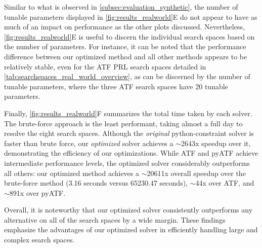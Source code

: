 Similar to what is observed in \cref{subsec:evaluation_synthetic}, the number of tunable parameters displayed in \cref{fig:results_realworld}E do not appear to have as much of an impact on performance as the other plots discussed. 
Nevertheless, \cref{fig:results_realworld}E is useful to discern the individual search spaces based on the number of parameters. 
For instance, it can be noted that the performance difference between our optimized method and all other methods appears to be relatively stable, even for the ATF PRL search spaces detailed in \cref{tab:searchspaces_real_world_overview}, as can be discerned by the number of tunable parameters, where the three ATF search spaces have 20 tunable parameters.

Finally, \cref{fig:results_realworld}F summarizes the total time taken by each solver. 
The brute-force approach is the least performant, taking almost a full day to resolve the eight search spaces. 
Although the \textit{original} python-constraint solver is faster than brute force, our \textit{optimized} solver achieves a $\sim$2643x speedup over it, demonstrating the efficiency of our optimizations.
While ATF and pyATF achieve intermediate performance levels, the optimized solver considerably outperforms all others: our optimized method achieves a $\sim$20611x overall speedup over the brute-force method (3.16 seconds versus 65230.47 seconds), $\sim$44x over ATF, and $\sim$891x over pyATF. 

Overall, it is noteworthy that our optimized solver consistently outperforms any alternative on all of the search spaces by a wide margin. 
These findings emphasize the advantages of our optimized solver in efficiently handling large and complex search spaces.



